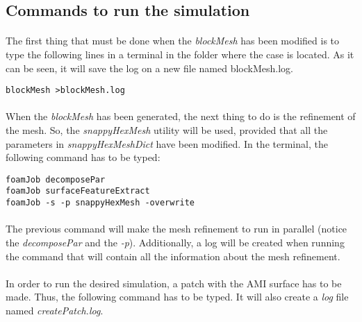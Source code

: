 \subsection{Commands to run the simulation}

\paragraph{}The first thing that must be done when the \textit{blockMesh} has been modified is to type the following lines in a terminal in the folder where the case is located. As it can be seen, it will save the log on a new file named blockMesh.log.

\begin{center}
\texttt{blockMesh >blockMesh.log}
\end{center}

\paragraph{}When the \textit{blockMesh} has been generated, the next thing to do is the refinement of the mesh. So, the \textit{snappyHexMesh} utility will be used, provided that all the parameters in \textit{snappyHexMeshDict} have been modified. In the terminal, the following command has to be typed:

\begin{center}
\texttt{foamJob decomposePar \\
foamJob surfaceFeatureExtract \\
foamJob -s -p snappyHexMesh -overwrite}
\end{center}

\paragraph{}The previous command will make the mesh refinement to run in parallel (notice the \textit{decomposePar} and the \textit{-p}). Additionally, a log will be created when running the command that will contain all the information about the mesh refinement.

\paragraph{}In order to run the desired simulation, a patch with the AMI surface has to be made. Thus, the following command has to be typed. It will also create a \textit{log} file named \textit{createPatch.log}.

